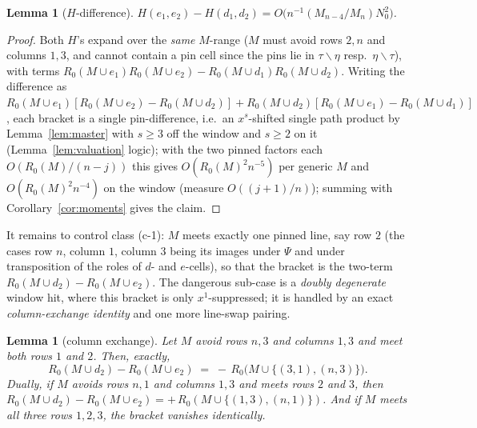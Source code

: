 \documentclass[11pt]{article}
\newtheorem{lemma}[theorem]{Lemma}
\theoremstyle{definition}
\begin{document}
\begin{lemma}[$H$-difference]\label{lem:Hdiff}
$H(e_1,e_2)-H(d_1,d_2)=O\bigl(n^{-1}(M_{n-4}/M_n)N_0^2\bigr)$.
\end{lemma}

\begin{proof}
Both $H$'s expand over the \emph{same} $M$-range ($M$ must avoid rows
$2,n$ and columns $1,3$, and cannot contain a pin cell since the pins
lie in $\tau\smallsetminus\eta$ resp.\ $\eta\smallsetminus\tau$), with
terms $R_0(M\cup e_1)R_0(M\cup e_2)-R_0(M\cup d_1)R_0(M\cup d_2)$.
Writing the difference as
$R_0(M\cup e_1)[R_0(M\cup e_2)-R_0(M\cup d_2)]
+R_0(M\cup d_2)[R_0(M\cup e_1)-R_0(M\cup d_1)]$, each bracket is a
single pin-difference, i.e.\ an $x^{s}$-shifted single path product by
Lemma~\ref{lem:master} with $s\ge3$ off the window and $s\ge2$ on it
(Lemma~\ref{lem:valuation} logic); with the two pinned factors each
$O(R_0(M)/(n-j))$ this gives $O(R_0(M)^2 n^{-5})$ per generic $M$ and
$O(R_0(M)^2n^{-4})$ on the window (measure $O((j{+}1)/n)$); summing with
Corollary~\ref{cor:moments} gives the claim.
\end{proof}

It remains to control class \textup{(c-1)}: $M$ meets exactly one
pinned line, say row $2$ (the cases row $n$, column $1$, column $3$
being its images under $\Psi$ and under transposition of the roles of
$d$- and $e$-cells), so that the bracket is the two-term
$R_0(M\cup d_2)-R_0(M\cup e_2)$.  The dangerous sub-case is a
\emph{doubly degenerate} window hit, where this bracket is only
$x^1$-suppressed; it is handled by an exact \emph{column-exchange
identity} and one more line-swap pairing.

\begin{lemma}[column exchange]\label{lem:colexchange}
Let $M$ avoid rows $n,3$ and columns $1,3$ and meet both rows $1$ and
$2$.  Then, exactly,
\[
R_0(M\cup d_2)-R_0(M\cup e_2)\;=\;-\,R_0\bigl(M\cup\{(3,1),(n,3)\}\bigr).
\]
Dually, if $M$ avoids rows $n,1$ and columns $1,3$ and meets rows $2$
and $3$, then
$R_0(M\cup d_2)-R_0(M\cup e_2)=+\,R_0(M\cup\{(1,3),(n,1)\})$.
And if $M$ meets all three rows $1,2,3$, the bracket vanishes
identically.
\end{lemma}
\end{document}
